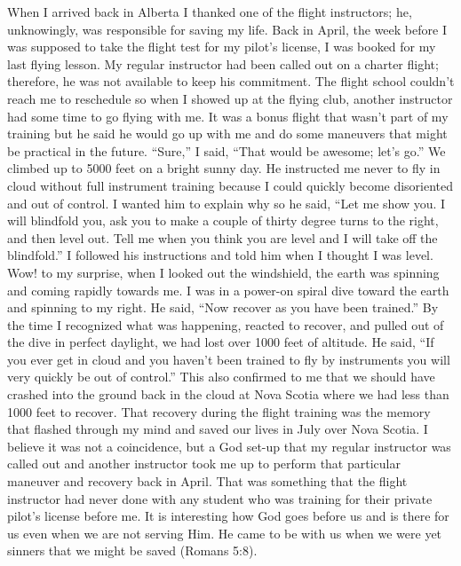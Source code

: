 \documentclass[oneside]{book}
\begin{document}
When I arrived back in Alberta I thanked one of the flight instructors; he, unknowingly, was responsible for saving my life. Back in April, the week before I was supposed to take the flight test for my pilot’s license, I was booked for my last flying lesson. My regular instructor had been called out on a charter flight; therefore, he was not available to keep his commitment. The flight school couldn't reach me to reschedule so when I showed up at the flying club, another instructor had some time to go flying with me. It was a bonus flight that wasn’t part of my training but he said he would go up with me and do some maneuvers that might be practical in the future. “Sure,” I said, “That would be awesome; let’s go.” We climbed up to 5000 feet on a bright sunny day. He instructed me never to fly in cloud without full instrument training because I could quickly become disoriented and out of control. I wanted him to explain why so he said, “Let me show you. I will blindfold you, ask you to make a couple of thirty degree turns to the right, and then level out. Tell me when you think you are level and I will take off the blindfold.” I followed his instructions and told him when I thought I was level. Wow! to my surprise, when I looked out the windshield, the earth was spinning and coming rapidly towards me. I was in a power-on spiral dive toward the earth and spinning to my right. He said, “Now recover as you have been trained.” By the time I recognized what was happening, reacted to recover, and pulled out of the dive in perfect daylight, we had lost over 1000 feet of altitude. He said, “If you ever get in cloud and you haven't been trained to fly by instruments you will very quickly be out of control.” This also confirmed to me that we should have crashed into the ground back in the cloud at Nova Scotia where we had less than 1000 feet to recover. That recovery during the flight training was the memory that flashed through my mind and saved our lives in July over Nova Scotia. I believe it was not a coincidence, but a God set-up that my regular instructor was called out and another instructor took me up to perform that particular maneuver and recovery back in April. That was something that the flight instructor had never done with any student who was training for their private pilot’s license before me. It is interesting how God goes before us and is there for us even when we are not serving Him. He came to be with us when we were yet sinners that we might be saved (Romans 5:8). 
\end{document}
